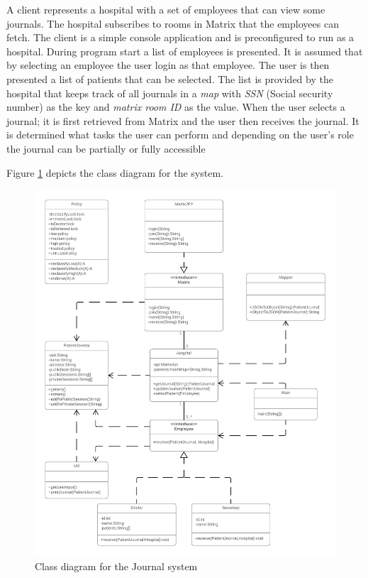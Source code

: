 A client represents a hospital with a set of employees that can view some journals. The hospital subscribes to rooms in Matrix that the employees can fetch. The client is a simple console application and is preconfigured to run as a hospital. During program start a list of employees is presented. It is assumed that by selecting an employee the user login as that employee. The user is then presented a list of patients that can be selected. The list is provided by the hospital that keeps track of all journals in a \emph{map} with \emph{SSN} (Social security number) as the key and \emph{matrix room ID} as the value. When the user selects a journal; it is first retrieved from Matrix and the user then receives the journal. It is determined what tasks the user can perform and depending on the user's role the journal can be partially or fully accessible 

Figure \ref{fig:journalsystem} depicts the class diagram for the system.


\begin{figure}[H] 
	\hspace*{-1.3cm}
	\centering
	\includegraphics[width=14cm]{figures/journalsystem_class.png}
	\caption{Class diagram for the Journal system}
	\label{fig:journalsystem}
\end{figure}






